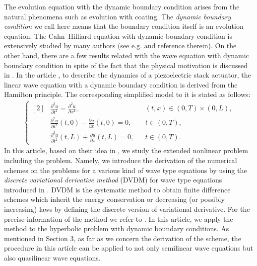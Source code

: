\documentclass[dvipdfmx-if-dvi,autodetect-engine,ja=standard]{amsart}
\numberwithin{equation}{section} %
\begin{document}
The evolution equation with the dynamic boundary condition arises from the natural phenomena such as 
evolution with coating. 
The \emph{dynamic boundary condition} we call here means that the boundary condition itself is an evolution equation. 
The Cahn--Hilliard equation with dynamic boundary condition is extensively studied by many authors (see e.g. \cite{mi} and reference therein). 
On the other hand, there are a few results related with the wave equation with dynamic boundary condition in spite of the fact that the physical 
motivation is discussed in \cite{me}. 
In the article \cite{me}, to describe the dynamics of a piezoelectric stack actuator, 
the linear wave equation with a dynamic boundary condition is derived from the Hamilton principle. 
The corresponding simplified model to it is stated as follows:  
\begin{align*}
    \left\{ \begin{aligned}[2]
    &\frac{\partial^2 u}{\partial t^2} = \frac{\partial^2 u}{\partial x^2},
    &&(t,x) \in (0,T)\times (0,L),\\
    &\frac{\partial^2 u}{\partial t^2}(t,0)
    - \frac{\partial u}{\partial x}(t,0) = 0,
    &&t\in (0,T),\\
    &\frac{\partial^2 u}{\partial t^2}(t,L)
    + \frac{\partial u}{\partial x}(t,L) = 0,
    &&t\in (0,T).
    \end{aligned}\right.
\end{align*}
In this article, based on their idea in \cite{me}, 
we study the extended nonlinear problem including the problem. 
Namely, we introduce the derivation of the numerical schemes on the problems for a various kind of wave type equations by using the \emph{discrete variational derivative method} (DVDM) for wave type equations introduced in \cite{2}. 
DVDM is the systematic method to obtain finite difference schemes which inherit the energy conservation or decreasing (or possibly increasing) laws by defining the 
discrete version of variational derivative. For the precise information of the method we refer to \cite{4}. 
In this article, we apply the method to the hyperbolic problem with dynamic boundary conditions.  
As mentioned in Section 3,
as far as we concern the derivation of the scheme,
the procedure in this article can be applied to not only semilinear wave equations but also quasilinear wave equations. 
\end{document}
